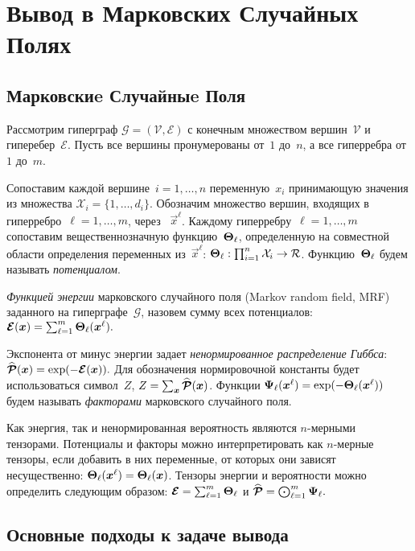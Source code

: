 \chapter{Вывод в Марковских Случайных Полях} \label{chap:mrf}
\section{Марковскиe Случайныe Поля} \label{sec:mrf}

Рассмотрим гиперграф $\mathcal{G} = (\mathcal{V}, \mathcal{E})$ с конечным множеством вершин~$\mathcal{V}$ и гиперебер~$\mathcal{E}$.
Пусть все вершины пронумерованы от~$1$ до~$n$, а все гиперребра от~$1$ до~$m$.

Сопоставим каждой вершине~$i = 1,\ldots,n$ переменную~$x_i$ принимающую значения из множества $\mathcal{X}_i = \{1,\dots,d_i\}$.
Обозначим множество вершин, входящих в гиперребро~$\ell = 1, \ldots, m$, через ~$\vec{x}^\ell$.
Каждому гиперребру~$\ell = 1, \ldots, m$ сопоставим вещественнозначную функцию~$\boldsymbol{\Theta}_\ell$, определенную на совместной области определения переменных из~$\vec{x}^\ell$: $\boldsymbol{\Theta}_\ell: \prod_{i=1}^n \mathcal{X}_i \to \mathcal{R}$. Функцию~$\boldsymbol{\Theta}_\ell$ будем называть \emph{потенциалом}.

\emph{Функцией энергии} марковского случайного поля (Markov random field, MRF) заданного на гиперграфе~$\mathcal{G}$, назовем сумму всех потенциалов:
$
\boldsymbol{\mathcal{E}}(\boldsymbol{x}) = \sum_{\ell = 1}^{m} \boldsymbol{\Theta}_\ell(\boldsymbol{x}^{\ell}).
$

Экспонента от минус энергии задает \emph{ненормированное распределение Гиббса}:
$
\widehat{\boldsymbol{\mathcal{P}}}(\boldsymbol{x}) = \exp(-\boldsymbol{\mathcal{E}}(\boldsymbol{x})).
$
Для обозначения нормировочной константы будет использоваться символ~$Z$, $Z = \sum_{\boldsymbol{x}} \widehat{\boldsymbol{\mathcal{P}}}(\boldsymbol{x})$. Функции $\boldsymbol{\Psi}_\ell(\boldsymbol{x}^\ell) = \exp(-\boldsymbol{\Theta}_\ell(\boldsymbol{x}^{\ell}))$ будем называть \emph{факторами} марковского случайного поля.

Как энергия, так и ненормированная вероятность являются $n$-мерными тензорами. Потенциалы и факторы можно интерпретировать как $n$-мерные тензоры, если добавить в них переменные, от которых они зависят несущественно: $\boldsymbol{\Theta}_\ell (\boldsymbol{x}^\ell) = \boldsymbol{\Theta}_\ell (\boldsymbol{x})$. Тензоры энергии и вероятности можно определить следующим образом:
$
\boldsymbol{\mathcal{E}} = \sum_{\ell = 1}^m \boldsymbol{\Theta}_\ell
$
и
$
\widehat{\boldsymbol{\mathcal{P}}} =   \bigodot_{\ell = 1}^m \boldsymbol{\Psi}_\ell.
$
\section{Основные подходы к задаче вывода} \label{sec:mrf-approaches}

